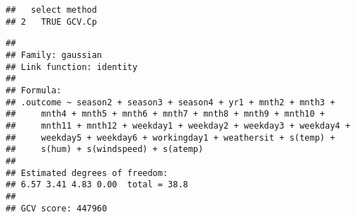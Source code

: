 \documentclass[]{article}
\newenvironment{Shaded}{\begin{snugshade}}{\end{snugshade}}
\newcommand{\KeywordTok}[1]{\textcolor[rgb]{0.13,0.29,0.53}{\textbf{#1}}}
\newcommand{\DataTypeTok}[1]{\textcolor[rgb]{0.13,0.29,0.53}{#1}}
\newcommand{\DecValTok}[1]{\textcolor[rgb]{0.00,0.00,0.81}{#1}}
\newcommand{\StringTok}[1]{\textcolor[rgb]{0.31,0.60,0.02}{#1}}
\newcommand{\CommentTok}[1]{\textcolor[rgb]{0.56,0.35,0.01}{\textit{#1}}}
\newcommand{\OtherTok}[1]{\textcolor[rgb]{0.56,0.35,0.01}{#1}}
\newcommand{\OperatorTok}[1]{\textcolor[rgb]{0.81,0.36,0.00}{\textbf{#1}}}
\newcommand{\NormalTok}[1]{#1}
\begin{document}
\begin{Shaded}
\end{Shaded}

\begin{verbatim}
##   select method
## 2   TRUE GCV.Cp
\end{verbatim}

\begin{Shaded}
\end{Shaded}

\begin{verbatim}
## 
## Family: gaussian 
## Link function: identity 
## 
## Formula:
## .outcome ~ season2 + season3 + season4 + yr1 + mnth2 + mnth3 + 
##     mnth4 + mnth5 + mnth6 + mnth7 + mnth8 + mnth9 + mnth10 + 
##     mnth11 + mnth12 + weekday1 + weekday2 + weekday3 + weekday4 + 
##     weekday5 + weekday6 + workingday1 + weathersit + s(temp) + 
##     s(hum) + s(windspeed) + s(atemp)
## 
## Estimated degrees of freedom:
## 6.57 3.41 4.83 0.00  total = 38.8 
## 
## GCV score: 447960
\end{verbatim}
\end{document}
